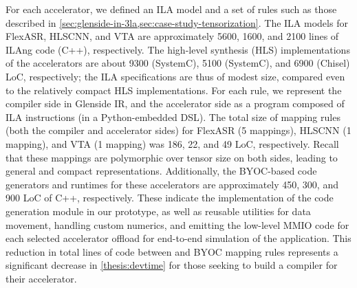 %
For each accelerator, we defined an ILA model and a set of \mapping rules
  such as those described in
  \cref{sec:glenside-in-3la,sec:case-study-tensorization}.
%
The ILA models for FlexASR, HLSCNN, and VTA are approximately 5600, 1600, and 2100 lines of ILAng code (C++), respectively. 
The high-level synthesis (HLS) implementations
  of the accelerators are about 9300 (SystemC), 5100 (SystemC), and 6900 (Chisel) LoC, %
  respectively;
  the ILA specifications are thus of modest size,
  compared even to the relatively compact HLS implementations. 
%
For each \mapping rule, we represent the compiler side in Glenside IR, and the accelerator side %
as a program composed of ILA instructions (in a Python-embedded DSL). 
The total size of mapping rules (both the compiler and accelerator sides) for FlexASR (5 mappings), HLSCNN (1 mapping), and VTA (1 mapping) was 186, 22, and 49 LoC, respectively.
Recall that these mappings are polymorphic over tensor size on both sides, leading to general and compact representations. 
Additionally, the BYOC-based code generators and runtimes for these accelerators are approximately 450, 300, and 900 LoC of C++, %
respectively. 
These indicate the implementation of the code generation module in our prototype, as well as reusable utilities for data movement, handling custom numerics, and emitting the low-level MMIO code for each selected accelerator offload for end-to-end simulation of the application.
This reduction in total lines of code
  between \g and BYOC mapping rules
  represents a significant
  decrease in \cref{thesis:devtime}
  for those seeking to build a compiler
  for their accelerator.

